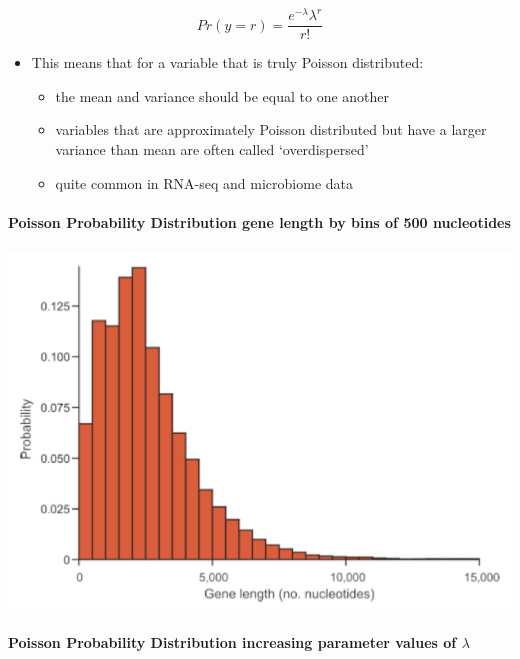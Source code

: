 \documentclass[]{book}
\providecommand{\tightlist}{%
  \setlength{\itemsep}{0pt}\setlength{\parskip}{0pt}}
\let\oldparagraph\paragraph
\renewcommand{\paragraph}[1]{\oldparagraph{#1}\mbox{}}
\begin{document}
\[Pr(y=r) = \frac{e^{-\lambda}\lambda^r}{r!}\]

\begin{itemize}
\tightlist
\item
  This means that for a variable that is truly Poisson distributed:

  \begin{itemize}
  \tightlist
  \item
    the mean and variance should be equal to one another
  \item
    variables that are approximately Poisson distributed but have a larger variance than mean are often called `overdispersed'
  \item
    quite common in RNA-seq and microbiome data
  \end{itemize}
\end{itemize}

\hypertarget{poisson-probability-distribution-gene-length-by-bins-of-500-nucleotides}{%
\paragraph{Poisson Probability Distribution \textbar{} gene length by bins of 500 nucleotides}\label{poisson-probability-distribution-gene-length-by-bins-of-500-nucleotides}}

\begin{center}\includegraphics[width=0.8\linewidth]{images/week_2.004} \end{center}

\hypertarget{poisson-probability-distribution-increasing-parameter-values-of-lambda}{%
\paragraph{\texorpdfstring{Poisson Probability Distribution \textbar{} increasing parameter values of \(\lambda\)}{Poisson Probability Distribution \textbar{} increasing parameter values of \textbackslash{}lambda}}\label{poisson-probability-distribution-increasing-parameter-values-of-lambda}}
\end{document}
